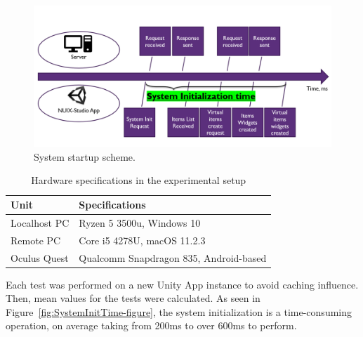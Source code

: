 \begin{figure}
  \centering
  \includegraphics[width = 0.9 \linewidth]{figures/SystemStartupScheme.png}
  \caption{System startup scheme.}
  \label{fig:SystemStartupScheme-figure}
\end{figure}

\begin{table}
  \centering
  \begin{threeparttable}[c]
    \caption{Hardware specifications in the experimental setup}
    \label{tab:hardware-specifications-table}
    \begin{tabular}{ll}
      \toprule
      Unit    &         Specifications                 \\
      \midrule
      Localhost PC & Ryzen 5 3500u, Windows 10 \\
      Remote PC & Core i5 4278U, macOS 11.2.3    \\
      Oculus Quest        & Qualcomm Snapdragon 835, Android-based            \\
      \bottomrule
    \end{tabular}
  \end{threeparttable}
\end{table}

Each test was performed on a new Unity App instance to avoid caching influence. Then, mean values for the tests were calculated. As seen in Figure~\ref{fig:SystemInitTime-figure}, the system initialization is a time-consuming operation, on average taking from 200ms to over 600ms to perform.

